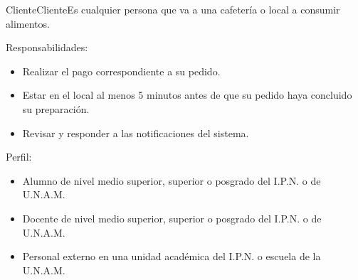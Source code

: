 \begin{Actor}{Cliente}{Cliente}{Es cualquier persona que va a una cafetería o local a consumir alimentos.}
	\item[Responsabilidades:]\hspace{1pt}
		\begin{itemize}
			\item Realizar el pago correspondiente a su pedido.
			\item Estar en el local al menos 5 minutos antes de que su pedido haya concluido su preparación.
			\item Revisar y responder a las notificaciones del sistema.
		\end{itemize}
	\item[Perfil:]\hspace{1pt}
		\begin{itemize}
		\item Alumno de nivel medio superior, superior o posgrado del I.P.N. o de U.N.A.M.
			\item Docente de nivel medio superior, superior o posgrado del I.P.N. o de U.N.A.M.
			\item Personal externo en una unidad académica del I.P.N. o escuela de la U.N.A.M.
		\end{itemize}
\end{Actor}


